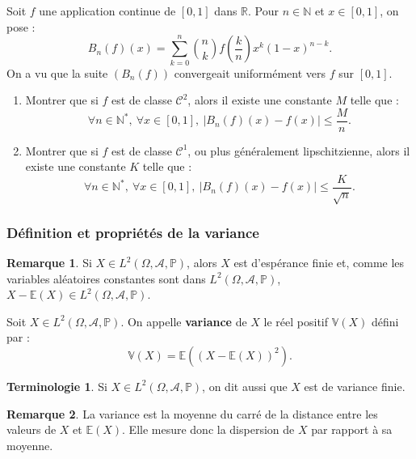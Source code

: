 \documentclass[french]{article}
\renewcommand{\P}{\mathbb{P}}
\newcommand{\N}{\mathbb{N}}
\newcommand{\R}{\mathbb{R}}
\newcommand{\st}{^*}
\newcommand{\E}{\mathbb{E}}
\newcommand{\V}{\mathbb{V}}
\theoremstyle{plain}
\theoremstyle{definition}
\newtheorem*{rmq}{Remarque}
\newtheorem*{terminologie}{Terminologie}
\theoremstyle{remark}
\begin{document}
\begin{exo}
	Soit $f$ une application continue de $[0,1]$ dans $\R$. Pour $n\in\N$ et $x\in[0,1]$, on pose :
	$$B_n(f)(x)=\sum_{k=0}^{n}\binom{n}{k}f\left(\frac{k}{n}\right)x^k(1-x)^{n-k}.$$
	On a vu que la suite $(B_n(f))$ convergeait uniformément vers $f$ sur $[0,1]$.
	\begin{enumerate}
		\item Montrer que si $f$ est de classe $\mathcal{C}^2$, alors il existe une constante $M$ telle que :
		$$\forall n\in\N\st,\ \forall x\in [0,1],\ \lvert B_n(f)(x)-f(x)\rvert\leqslant\frac{M}{n}.$$ %
		\item Montrer que si $f$ est de classe $\mathcal{C}^1$, ou plus généralement lipschitzienne, alors il existe une constante $K$ telle que :
		$$\forall n\in\N\st,\ \forall x\in[0,1],\ \lvert B_n(f)(x)-f(x)\rvert\leqslant\frac{K}{\sqrt{n}}.$$
	\end{enumerate}
\end{exo}

\subsubsection*{Définition et propriétés de la variance}

\begin{rmq}
	Si $X\in L^2(\Omega,\mathcal{A},\P)$, alors $X$ est d'espérance finie et, comme les variables aléatoires constantes sont dans $L^2(\Omega,\mathcal{A},\P)$, $X-\E(X)\in L^2(\Omega,\mathcal{A},\P)$.
\end{rmq}

\begin{dfn}
	Soit $X\in L^2(\Omega,\mathcal{A},\P)$. On appelle \textbf{variance} de $X$ le réel positif $\V(X)$ défini par :
	$$\V(X)=\E((X-\E(X))^2).$$
\end{dfn}

\begin{terminologie}
	Si $X\in L^2(\Omega,\mathcal{A},\P)$, on dit aussi que $X$ est de variance finie.
\end{terminologie}

\begin{rmq}
	La variance est la moyenne du carré de la distance entre les valeurs de $X$ et $\E(X)$. Elle mesure donc la dispersion de $X$ par rapport à sa moyenne.
\end{rmq}
\end{document}

